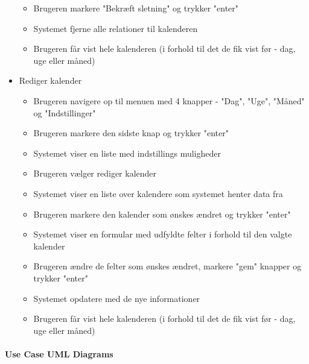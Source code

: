 \begin{itemize}
\begin{itemize}
   \item Brugeren markere "Bekræft sletning" og trykker "enter"
   \item Systemet fjerne alle relationer til kalenderen
   \item Brugeren får vist hele kalenderen (i forhold til det de fik vist før - dag, uge eller måned)
   \end{itemize}
   \item Rediger kalender
   \begin{itemize}
   \item Brugeren navigere op til menuen med 4 knapper - "Dag", "Uge", "Måned" og "Indstillinger"
   \item Brugeren markere den sidste knap og trykker "enter"
   \item Systemet viser en liste med indstillings muligheder
   \item Brugeren vælger rediger kalender
   \item Systemet viser en liste over kalendere som systemet henter data fra
   \item Brugeren markere den kalender som ønskes ændret og trykker "enter"
   \item Systemet viser en formular med udfyldte felter i forhold til den valgte kalender
   \item Brugeren ændre de felter som ønskes ændret, markere "gem" knapper og trykker "enter"
   \item Systemet opdatere med de nye informationer
   \item Brugeren får vist hele kalenderen (i forhold til det de fik vist før - dag, uge eller måned)
   \end{itemize}
   \end{itemize}
   
   \newpage 
   \paragraph{Use Case UML Diagrams} \mbox{}

